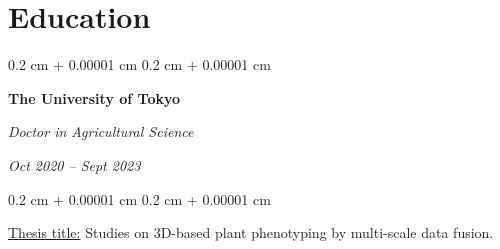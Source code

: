 \documentclass[10pt, a4paper]{article}
\newenvironment{highlights}{
    \begin{itemize}[
        topsep=0.10 cm,
        parsep=0.10 cm,
        partopsep=0pt,
        itemsep=0pt,
        leftmargin=0.4 cm + 10pt
    ]
}{
    \end{itemize}
} %
\newenvironment{onecolentry}{
    \begin{adjustwidth}{
        0.2 cm + 0.00001 cm
    }{
        0.2 cm + 0.00001 cm
    }
}{
    \end{adjustwidth}
} %
\newenvironment{twocolentry}[2][]{
    \onecolentry
    \def\secondColumn{#2}
    \setcolumnwidth{\fill, 4.5 cm}
    \begin{paracol}{2}
}{
    \switchcolumn \raggedleft \secondColumn
    \end{paracol}
    \endonecolentry
} %
\let\hrefWithoutArrow\href
\renewcommand{\href}[2]{\hrefWithoutArrow{#1}{\ifthenelse{\equal{#2}{}}{ }{#2 }\raisebox{.15ex}{\footnotesize \faExternalLink*}}}
\begin{document}

            
            



    \section{Education}
        
        \begin{twocolentry}{
            \textit{Oct 2020 – Sept 2023}}
            \textbf{The University of Tokyo}

            \textit{Doctor in Agricultural Science}
        \end{twocolentry}

        \vspace{0.10 cm}
        \begin{onecolentry}
            \underline{Thesis title:} Studies on 3D-based plant phenotyping by multi-scale data fusion.
        \end{onecolentry}
\end{document}
